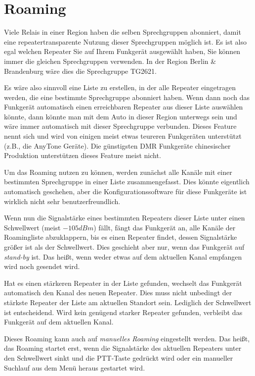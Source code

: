 \section{Roaming} \label{sec:roaming}
Viele Relais in einer Region haben die selben Sprechgruppen abonniert, damit eine repeatertransparente Nutzung dieser Sprechgruppen möglich ist. Es ist also egal welchen Repeater Sie auf Ihrem Funkgerät ausgewählt haben, Sie können immer die gleichen Sprechgruppen verwenden. In der Region Berlin \& Brandenburg wäre dies die Sprechgruppe TG2621. 

Es wäre also sinnvoll eine Liste zu erstellen, in der alle Repeater eingetragen werden, die eine bestimmte Sprechgruppe abonniert haben. Wenn dann noch das Funkgerät automatisch einen erreichbaren Repeater aus dieser Liste auswählen könnte, dann könnte man mit dem Auto in dieser Region unterwegs sein und wäre immer automatisch mit dieser Sprechgruppe verbunden. Dieses Feature nennt sich  und wird von einigen meist etwas teureren Funkgeräten unterstützt (z.B., die AnyTone Geräte). Die günstigsten DMR Funkgeräte chinesischer Produktion unterstützen dieses Feature meist nicht. 

Um das Roaming nutzen zu können, werden zunächst alle Kanäle mit einer bestimmten Sprechgruppe in einer Liste zusammengefasst. Dies könnte eigentlich automatisch geschehen, aber die Konfigurationssoftware für diese Funkgeräte ist wirklich nicht sehr benutzerfreundlich. 

Wenn nun die Signalstärke eines bestimmten Repeaters dieser Liste unter einen Schwellwert (meist $-105dBm$) fällt, fängt das Funkgerät an, alle Kanäle der Roamingliste abzuklappern, bis es einen Repeater findet, dessen Signalstärke größer ist als der Schwellwert. Dies geschieht aber nur, wenn das Funkgerät auf \emph{stand-by} ist. Das heißt, wenn weder etwas auf dem aktuellen Kanal empfangen wird noch gesendet wird. 

Hat es einen stärkeren Repeater in der Liste gefunden, wechselt das Funkgerät automatisch den Kanal des neuen Repeater. Dies muss nicht unbedingt der stärkste Repeater der Liste am aktuellen Standort sein. Lediglich der Schwellwert ist entscheidend. Wird kein genügend starker Repeater gefunden, verbleibt das Funkgerät auf dem aktuellen Kanal. 

Dieses Roaming kann auch auf \emph{manuelles Roaming} eingestellt werden. Das heißt, das Roaming startet erst, wenn die Signalstärke des aktuellen Repeaters unter den Schwellwert sinkt und die PTT-Taste gedrückt wird oder ein manueller Suchlauf aus dem Menü heraus gestartet wird. 